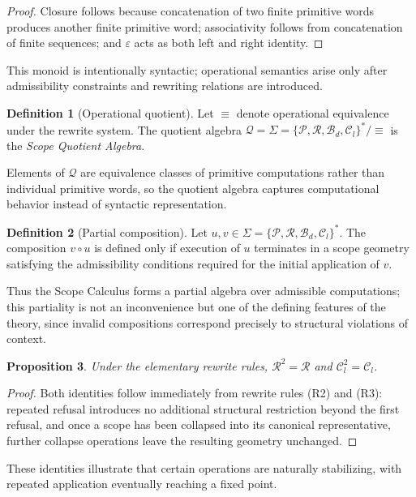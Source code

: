 \documentclass[11pt,twoside,openright]{book}
\numberwithin{equation}{chapter}
\theoremstyle{definition}
\newtheorem{definition}{Definition}[chapter]
\theoremstyle{plain}
\newtheorem{proposition}[definition]{Proposition}
\theoremstyle{remark}
\theoremstyle{definition}
\newcommand{\Alphabet}{\Sigma}
\newcommand{\Pop}{\mathcal{P}}
\newcommand{\Refuse}{\mathcal{R}}
\newcommand{\Bind}{\mathcal{B}_d}
\newcommand{\Collapse}{\mathcal{C}_l}
\newcommand{\ScopeAlphabet}{\Alphabet=\{\Pop,\Refuse,\Bind,\Collapse\}}
\begin{document}
\begin{proof}
Closure follows because concatenation of two finite primitive words
produces another finite primitive word; associativity follows from
concatenation of finite sequences; and $\varepsilon$ acts as both left and
right identity.
\end{proof}

This monoid is intentionally syntactic; operational semantics arise only
after admissibility constraints and rewriting relations are introduced.

\begin{definition}[Operational quotient]
Let $\equiv$ denote operational equivalence under the rewrite system. The
quotient algebra $\mathcal{Q}=\ScopeAlphabet^{*}/\equiv$ is the \emph{Scope
Quotient Algebra}.
\end{definition}

Elements of $\mathcal{Q}$ are equivalence classes of primitive
computations rather than individual primitive words, so the quotient
algebra captures computational behavior instead of syntactic
representation.

\begin{definition}[Partial composition]
Let $u,v\in\ScopeAlphabet^{*}$. The composition $v\circ u$ is defined only
if execution of $u$ terminates in a scope geometry satisfying the
admissibility conditions required for the initial application of $v$.
\end{definition}

Thus the Scope Calculus forms a partial algebra over admissible
computations; this partiality is not an inconvenience but one of the
defining features of the theory, since invalid compositions correspond
precisely to structural violations of context.

\begin{proposition}
Under the elementary rewrite rules, $\Refuse^2=\Refuse$ and
$\Collapse^2=\Collapse$.
\end{proposition}

\begin{proof}
Both identities follow immediately from rewrite rules (R2) and (R3):
repeated refusal introduces no additional structural restriction beyond
the first refusal, and once a scope has been collapsed into its canonical
representative, further collapse operations leave the resulting geometry
unchanged.
\end{proof}

These identities illustrate that certain operations are naturally
stabilizing, with repeated application eventually reaching a fixed point.
\end{document}
